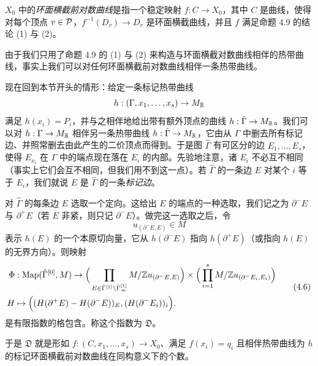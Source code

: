 
\begin{definition}
$X_0$ 中的\emph{环面横截前对数曲线}是指一个稳定映射 $f:C\to X_0$，其中 $C$ 是曲线，使得对每个顶点 $v\in\mathcal{P}$，$f^{-1}(D_v)\to D_v$ 是环面横截曲线，并且 $f$ 满足命题 4.9 的结论 (1) 与 (2)。
\end{definition}

由于我们只用了命题 4.9 的 (1) 与 (2) 来构造与环面横截对数曲线相伴的热带曲线，事实上我们可以对任何环面横截前对数曲线相伴一条热带曲线。

现在回到本节开头的情形：给定一条标记热带曲线
\[
h:(\Gamma,x_1,\dots,x_s)\to M_{\mathbb{R}}
\]
满足 $h(x_i)=P_i$，并与之相伴地给出带有额外顶点的曲线 $h:\tilde\Gamma\to M_{\mathbb{R}}$。我们可以对 $h:\Gamma\to M_{\mathbb{R}}$ 相伴另一条热带曲线 $h:\hat\Gamma\to M_{\mathbb{R}}$，它由从 $\Gamma$ 中删去所有标记边、并照常删去由此产生的二价顶点而得到。于是图 $\hat\Gamma$ 有可区分的边 $E_1,\dots,E_s$，使得 $E_{x_i}$ 在 $\Gamma$ 中的端点现在落在 $E_i$ 的内部。先验地注意，诸 $E_i$ 不必互不相同（事实上它们会互不相同，但我们用不到这一点）。若 $\hat\Gamma$ 的一条边 $E$ 对某个 $i$ 等于 $E_i$，我们就说 $E$ 是 $\hat\Gamma$ 的一条\emph{标记边}。

\begin{proposition}
对 $\hat\Gamma$ 的每条边 $E$ 选取一个定向。这给出 $E$ 的端点的一种选取，我们记之为 $\partial^-E$ 与 $\partial^+E$（若 $E$ 非紧，则只记 $\partial^-E$）。做完这一选取之后，令
\[
u_{(\partial^-E,E)}\in M
\]
表示 $h(E)$ 的一个本原切向量，它从 $h(\partial^-E)$ 指向 $h(\partial^+E)$（或指向 $h(E)$ 的无界方向）。则映射
\begin{equation}
\begin{aligned}
\Phi&:\operatorname{Map}(\hat\Gamma^{[0]},M)\to\Big(\prod_{E\in\hat\Gamma^{[1]}\setminus\hat\Gamma^{[1]}_\infty}M/\mathbb{Z} u_{(\partial^-E,E)}\Big)\times\Big(\prod_{i=1}^sM/\mathbb{Z} u_{(\partial^-E_i,E_i)}\Big)\\
H&\mapsto\Big((H(\partial^+E)-H(\partial^-E))_E,(H(\partial^-E_i))_i\Big).
\end{aligned}
\tag{4.6}
\end{equation}
是有限指数的格包含。称这个指数为 $\mathfrak{D}$。
\end{proposition}

于是 $\mathfrak{D}$ 就是形如 $f:(C,x_1,\dots,x_s)\to X_0$、满足 $f(x_i)=q_i$ 且相伴热带曲线为 $h$ 的标记环面横截前对数曲线在同构意义下的个数。

